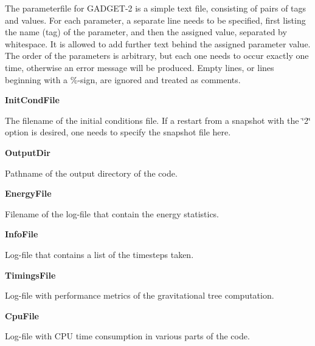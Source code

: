 \-The parameterfile for \-G\-A\-D\-G\-E\-T-\/2 is a simple text file, consisting of pairs of tags and values. \-For each parameter, a separate line needs to be specified, first listing the name (tag) of the parameter, and then the assigned value, separated by whitespace. \-It is allowed to add further text behind the assigned parameter value. \-The order of the parameters is arbitrary, but each one needs to occur exactly one time, otherwise an error message will be produced. \-Empty lines, or lines beginning with a \%-\/sign, are ignored and treated as comments.


\begin{DoxyItemize}
\item {\bfseries \-Init\-Cond\-File} \par
 \-The filename of the initial conditions file. \-If a restart from a snapshot with the \char`\"{}2\char`\"{} option is desired, one needs to specify the snapshot file here.
\end{DoxyItemize}


\begin{DoxyItemize}
\item {\bfseries \-Output\-Dir} \par
 \-Pathname of the output directory of the code.
\end{DoxyItemize}


\begin{DoxyItemize}
\item {\bfseries \-Energy\-File} \par
 \-Filename of the log-\/file that contain the energy statistics.
\end{DoxyItemize}


\begin{DoxyItemize}
\item {\bfseries \-Info\-File} \par
 \-Log-\/file that contains a list of the timesteps taken.
\end{DoxyItemize}


\begin{DoxyItemize}
\item {\bfseries \-Timings\-File} \par
 \-Log-\/file with performance metrics of the gravitational tree computation.
\end{DoxyItemize}


\begin{DoxyItemize}
\item {\bfseries \-Cpu\-File} \par
 \-Log-\/file with \-C\-P\-U time consumption in various parts of the code.
\end{DoxyItemize}


